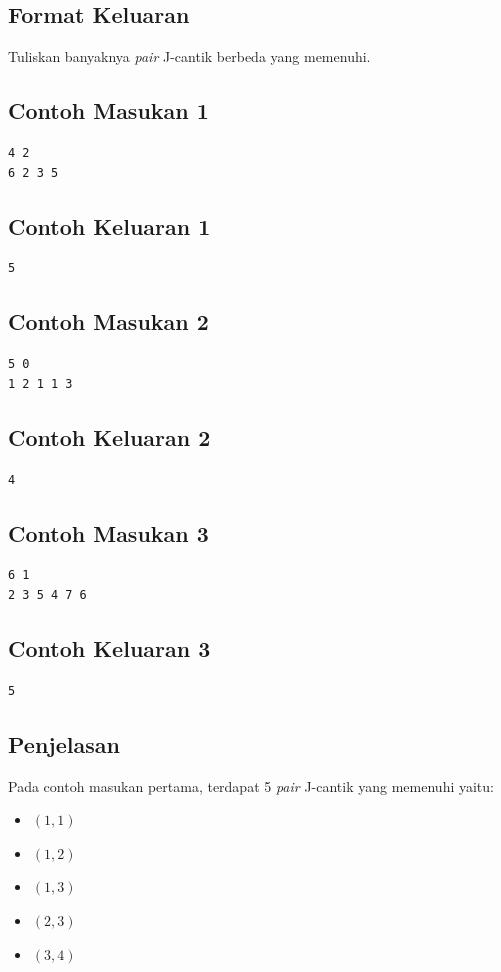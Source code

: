 \documentclass{article}
\begin{document}
\subsection*{Format Keluaran}
Tuliskan banyaknya \textit{pair} J-cantik berbeda yang memenuhi.

\begin{multicols}{2}
\subsection*{Contoh Masukan 1}
\begin{lstlisting}
4 2
6 2 3 5
\end{lstlisting}
\columnbreak

\subsection*{Contoh Keluaran 1}
\begin{lstlisting}
5
\end{lstlisting}
\vfill
\null
\end{multicols}

\begin{multicols}{2}
\subsection*{Contoh Masukan 2}
\begin{lstlisting}
5 0
1 2 1 1 3
\end{lstlisting}
\columnbreak

\subsection*{Contoh Keluaran 2}
\begin{lstlisting}
4
\end{lstlisting}
\vfill
\null
\end{multicols}

\begin{multicols}{2}
\subsection*{Contoh Masukan 3}
\begin{lstlisting}
6 1
2 3 5 4 7 6
\end{lstlisting}
\columnbreak

\subsection*{Contoh Keluaran 3}
\begin{lstlisting}
5
\end{lstlisting}
\vfill
\null
\end{multicols}

\subsection*{Penjelasan}
Pada contoh masukan pertama, terdapat 5 \textit{pair} J-cantik yang memenuhi yaitu:
\begin{itemize}
    \item $(1,1)$
    \item $(1,2)$
    \item $(1,3)$
    \item $(2,3)$
    \item $(3,4)$
\end{itemize}
\end{document}
